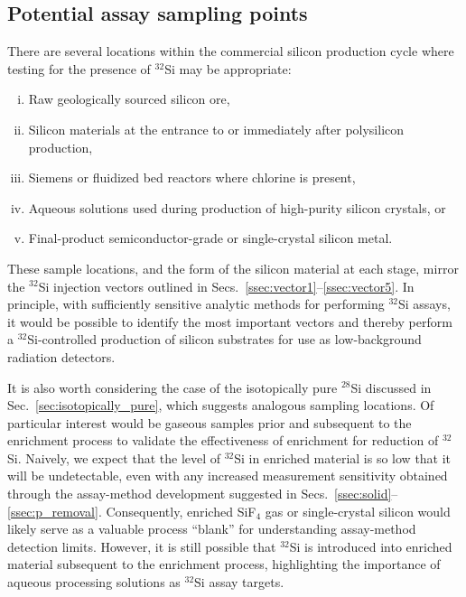 \documentclass[final,5p]{elsarticle}
\def\si{$^{32}$Si\xspace}
\def\esi{$^{28}$Si\xspace}
\begin{document}
\subsection{Potential assay sampling points}\label{ssec:sampling}
There are several locations within the commercial silicon production cycle where testing for the presence of \si may be appropriate:
\begin{enumerate}[i)]
\item Raw geologically sourced silicon ore,
\item Silicon materials at the entrance to or immediately after polysilicon production,
\item Siemens or fluidized bed reactors where chlorine is present,
\item Aqueous solutions used during production of high-purity silicon crystals, or
\item Final-product semiconductor-grade or single-crystal silicon metal.
\end{enumerate}
These sample locations, and the form of the silicon material at each stage, mirror the \si injection vectors outlined in Secs.\ \ref{ssec:vector1}--\ref{ssec:vector5}. In principle, with sufficiently sensitive analytic methods for performing \si assays, it would be possible to identify the most important vectors and thereby perform a \si-controlled production of silicon substrates for use as low-background radiation detectors.

It is also worth considering the case of the isotopically pure \esi discussed in Sec.\ \ref{sec:isotopically_pure}, which suggests analogous sampling locations.  Of particular interest would be gaseous samples prior and subsequent to the enrichment process to validate the effectiveness of enrichment for reduction of \si. Naively, we expect that the level of \si in enriched material is so low that it will be undetectable, even with any increased measurement sensitivity obtained through the assay-method development suggested in Secs.\ \ref{ssec:solid}--\ref{ssec:p_removal}. Consequently, enriched SiF$_4$ gas or single-crystal silicon would likely serve as a valuable process ``blank'' for understanding assay-method detection limits.  However, it is still possible that \si is introduced into enriched material subsequent to the enrichment process, highlighting the importance of aqueous processing solutions as \si assay targets.
\end{document}
